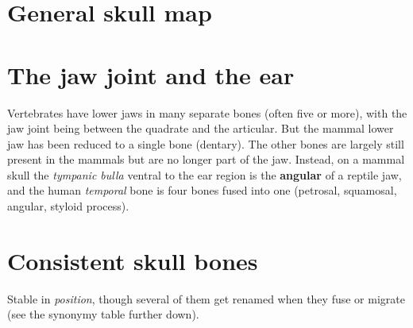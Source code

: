 \documentclass[11pt]{article}
\newcommand{\bone}[1]{\textbf{#1}}
\newcommand{\term}[1]{\textsl{#1}}
\begin{document}
\section{General skull map}

\figBoneMap

\figSkullVariants


\section{The jaw joint and the ear}

\figOssicles

\noindent
{\footnotesize Vertebrates have lower jaws in many separate bones (often five or more), with the jaw joint being between the quadrate and the articular. But the mammal lower jaw has been reduced to a single bone (dentary). The other bones are largely still present in the mammals but are no longer part of the jaw. Instead, on a mammal skull the \term{tympanic bulla} ventral to the ear region is the \bone{angular} of a reptile jaw, and the human \term{temporal} bone is four bones fused into one (petrosal, squamosal, angular,
styloid process).\par}

\section{Consistent skull bones}

Stable in \emph{position}, though several of them get renamed when they fuse
or migrate (see the synonymy table further down).
\end{document}
